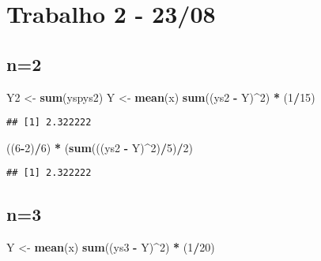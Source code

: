 \documentclass[]{article}
\newenvironment{Shaded}{\begin{snugshade}}{\end{snugshade}}
\newcommand{\KeywordTok}[1]{\textcolor[rgb]{0.13,0.29,0.53}{\textbf{#1}}}
\newcommand{\DecValTok}[1]{\textcolor[rgb]{0.00,0.00,0.81}{#1}}
\newcommand{\StringTok}[1]{\textcolor[rgb]{0.31,0.60,0.02}{#1}}
\newcommand{\OperatorTok}[1]{\textcolor[rgb]{0.81,0.36,0.00}{\textbf{#1}}}
\newcommand{\NormalTok}[1]{#1}
\begin{document}
\section{Trabalho 2 - 23/08}\label{trabalho-2---2308}

\subsection{n=2}\label{n2}

\begin{Shaded}
\begin{Highlighting}[]
\NormalTok{Y2 <-}\StringTok{ }\KeywordTok{sum}\NormalTok{(yspys2)}
\NormalTok{Y <-}\StringTok{ }\KeywordTok{mean}\NormalTok{(x)}
\KeywordTok{sum}\NormalTok{((ys2 }\OperatorTok{-}\StringTok{ }\NormalTok{Y)}\OperatorTok{^}\DecValTok{2}\NormalTok{) }\OperatorTok{*}\StringTok{ }\NormalTok{(}\DecValTok{1}\OperatorTok{/}\DecValTok{15}\NormalTok{)}
\end{Highlighting}
\end{Shaded}

\begin{verbatim}
## [1] 2.322222
\end{verbatim}

\begin{Shaded}
\begin{Highlighting}[]
\NormalTok{((}\DecValTok{6}\OperatorTok{-}\DecValTok{2}\NormalTok{)}\OperatorTok{/}\DecValTok{6}\NormalTok{) }\OperatorTok{*}\StringTok{ }\NormalTok{(}\KeywordTok{sum}\NormalTok{(((ys2 }\OperatorTok{-}\StringTok{ }\NormalTok{Y)}\OperatorTok{^}\DecValTok{2}\NormalTok{)}\OperatorTok{/}\DecValTok{5}\NormalTok{)}\OperatorTok{/}\DecValTok{2}\NormalTok{)}
\end{Highlighting}
\end{Shaded}

\begin{verbatim}
## [1] 2.322222
\end{verbatim}

\subsection{n=3}\label{n3}

\begin{Shaded}
\begin{Highlighting}[]
\NormalTok{Y <-}\StringTok{ }\KeywordTok{mean}\NormalTok{(x)}
\KeywordTok{sum}\NormalTok{((ys3 }\OperatorTok{-}\StringTok{ }\NormalTok{Y)}\OperatorTok{^}\DecValTok{2}\NormalTok{) }\OperatorTok{*}\StringTok{ }\NormalTok{(}\DecValTok{1}\OperatorTok{/}\DecValTok{20}\NormalTok{)}
\end{Highlighting}
\end{Shaded}
\end{document}
